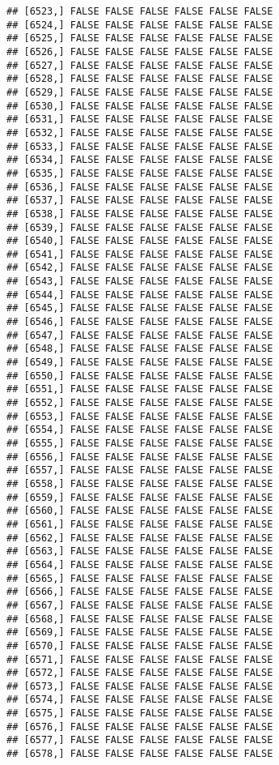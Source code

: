 \documentclass[
]{article}
\begin{document}
\begin{verbatim}
## [6523,] FALSE FALSE FALSE FALSE FALSE FALSE
## [6524,] FALSE FALSE FALSE FALSE FALSE FALSE
## [6525,] FALSE FALSE FALSE FALSE FALSE FALSE
## [6526,] FALSE FALSE FALSE FALSE FALSE FALSE
## [6527,] FALSE FALSE FALSE FALSE FALSE FALSE
## [6528,] FALSE FALSE FALSE FALSE FALSE FALSE
## [6529,] FALSE FALSE FALSE FALSE FALSE FALSE
## [6530,] FALSE FALSE FALSE FALSE FALSE FALSE
## [6531,] FALSE FALSE FALSE FALSE FALSE FALSE
## [6532,] FALSE FALSE FALSE FALSE FALSE FALSE
## [6533,] FALSE FALSE FALSE FALSE FALSE FALSE
## [6534,] FALSE FALSE FALSE FALSE FALSE FALSE
## [6535,] FALSE FALSE FALSE FALSE FALSE FALSE
## [6536,] FALSE FALSE FALSE FALSE FALSE FALSE
## [6537,] FALSE FALSE FALSE FALSE FALSE FALSE
## [6538,] FALSE FALSE FALSE FALSE FALSE FALSE
## [6539,] FALSE FALSE FALSE FALSE FALSE FALSE
## [6540,] FALSE FALSE FALSE FALSE FALSE FALSE
## [6541,] FALSE FALSE FALSE FALSE FALSE FALSE
## [6542,] FALSE FALSE FALSE FALSE FALSE FALSE
## [6543,] FALSE FALSE FALSE FALSE FALSE FALSE
## [6544,] FALSE FALSE FALSE FALSE FALSE FALSE
## [6545,] FALSE FALSE FALSE FALSE FALSE FALSE
## [6546,] FALSE FALSE FALSE FALSE FALSE FALSE
## [6547,] FALSE FALSE FALSE FALSE FALSE FALSE
## [6548,] FALSE FALSE FALSE FALSE FALSE FALSE
## [6549,] FALSE FALSE FALSE FALSE FALSE FALSE
## [6550,] FALSE FALSE FALSE FALSE FALSE FALSE
## [6551,] FALSE FALSE FALSE FALSE FALSE FALSE
## [6552,] FALSE FALSE FALSE FALSE FALSE FALSE
## [6553,] FALSE FALSE FALSE FALSE FALSE FALSE
## [6554,] FALSE FALSE FALSE FALSE FALSE FALSE
## [6555,] FALSE FALSE FALSE FALSE FALSE FALSE
## [6556,] FALSE FALSE FALSE FALSE FALSE FALSE
## [6557,] FALSE FALSE FALSE FALSE FALSE FALSE
## [6558,] FALSE FALSE FALSE FALSE FALSE FALSE
## [6559,] FALSE FALSE FALSE FALSE FALSE FALSE
## [6560,] FALSE FALSE FALSE FALSE FALSE FALSE
## [6561,] FALSE FALSE FALSE FALSE FALSE FALSE
## [6562,] FALSE FALSE FALSE FALSE FALSE FALSE
## [6563,] FALSE FALSE FALSE FALSE FALSE FALSE
## [6564,] FALSE FALSE FALSE FALSE FALSE FALSE
## [6565,] FALSE FALSE FALSE FALSE FALSE FALSE
## [6566,] FALSE FALSE FALSE FALSE FALSE FALSE
## [6567,] FALSE FALSE FALSE FALSE FALSE FALSE
## [6568,] FALSE FALSE FALSE FALSE FALSE FALSE
## [6569,] FALSE FALSE FALSE FALSE FALSE FALSE
## [6570,] FALSE FALSE FALSE FALSE FALSE FALSE
## [6571,] FALSE FALSE FALSE FALSE FALSE FALSE
## [6572,] FALSE FALSE FALSE FALSE FALSE FALSE
## [6573,] FALSE FALSE FALSE FALSE FALSE FALSE
## [6574,] FALSE FALSE FALSE FALSE FALSE FALSE
## [6575,] FALSE FALSE FALSE FALSE FALSE FALSE
## [6576,] FALSE FALSE FALSE FALSE FALSE FALSE
## [6577,] FALSE FALSE FALSE FALSE FALSE FALSE
## [6578,] FALSE FALSE FALSE FALSE FALSE FALSE

\end{verbatim}
\end{document}
